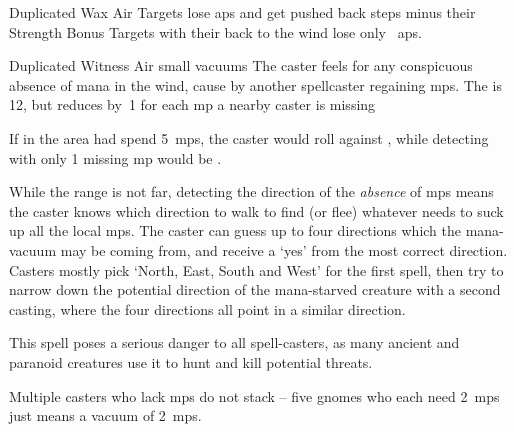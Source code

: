 \ifodd\value{diceNo}

  {Duplicated}%
  {Wax}%
  {Air}%
  {}%
  {Targets lose  \glspl{ap} and get pushed back  \glspl{step} minus their Strength Bonus}%
  {Targets with their back to the wind lose only
  \setcounter{track}{\value{spellPlusTwo}}%
  ~\glspl{ap}.}

\else

  {Duplicated}%
  {Witness}%
  {Air}%
  {small vacuums}%
  {The caster feels for any conspicuous absence of mana in the wind, cause by another spellcaster regaining \glspl{mp}.
  The  is 12, but reduces by~1 for each \gls{mp} a nearby caster is missing}%
  {If  in the \gls{area} had spend 5~\glspl{mp}, the caster would roll against \tn[7], while detecting  with only 1 missing \gls{mp} would be \tn[11].

  While the range is not far, detecting the direction of the \emph{absence} of \glspl{mp} means the caster knows which direction to walk to find (or flee) whatever needs to suck up all the local \glspl{mp}.
  The caster can guess up to four directions which the mana-vacuum may be coming from, and receive a `yes' from the most correct direction.
  Casters mostly pick `North, East, South and West' for the first spell, then try to narrow down the potential direction of the mana-starved creature with a second casting, where the four directions all point in a similar direction.

  This spell poses a serious danger to all spell-casters, as many ancient and paranoid creatures use it to hunt and kill potential threats.

  Multiple casters who lack \glspl{mp} do not stack -- five gnomes who each need 2~\glspl{mp} just means a vacuum of 2~\glspl{mp}.}

\fi
{}
